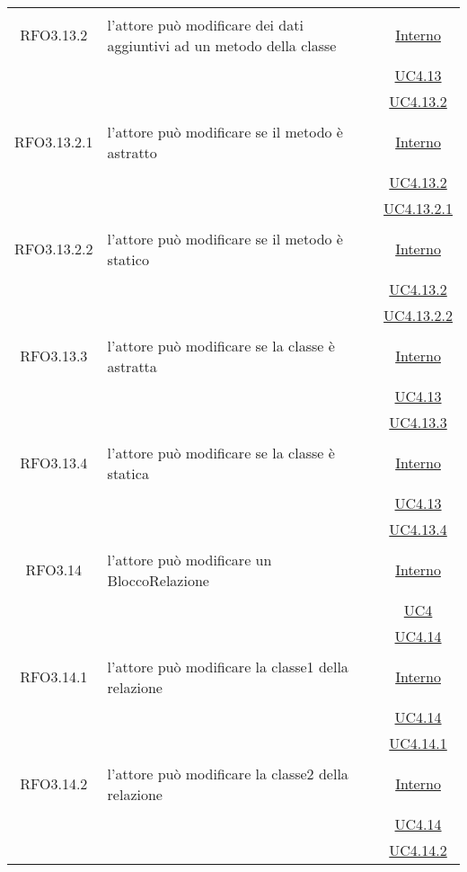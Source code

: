 \begin{longtable}{|c|>{\centering}m{7cm}|c|}
\hypertarget{RFO3.13.2}{RFO3.13.2} & l'attore può modificare dei dati aggiuntivi ad un metodo della classe & \hyperlink{Interno}{Interno}\\
& &\hyperref[UC4.13]{UC4.13}\\
& &\hyperref[UC4.13.2]{UC4.13.2}\\ \hline

\hypertarget{RFO3.13.2.1}{RFO3.13.2.1} & l'attore può modificare se il metodo è astratto & \hyperlink{Interno}{Interno}\\
& &\hyperref[UC4.13.2]{UC4.13.2}\\
& &\hyperref[UC4.13.2.1]{UC4.13.2.1}\\ \hline

\hypertarget{RFO3.13.2.2}{RFO3.13.2.2} & l'attore può modificare se il metodo è statico & \hyperlink{Interno}{Interno}\\
& &\hyperref[UC4.13.2]{UC4.13.2}\\
& &\hyperref[UC4.13.2.2]{UC4.13.2.2}\\ \hline%

\hypertarget{RFO3.13.3}{RFO3.13.3} & l'attore può modificare se la classe è astratta & \hyperlink{Interno}{Interno}\\
& &\hyperref[UC4.13]{UC4.13}\\
& &\hyperref[UC4.13.3]{UC4.13.3}\\ \hline

\hypertarget{RFO3.13.4}{RFO3.13.4} & l'attore può modificare se la classe è statica & \hyperlink{Interno}{Interno}\\
& &\hyperref[UC4.13]{UC4.13}\\
& &\hyperref[UC4.13.4]{UC4.13.4}\\ \hline

\hypertarget{RFO3.14}{RFO3.14} & l'attore può modificare un BloccoRelazione &  \hyperlink{Interno}{Interno}\\
& &\hyperref[UC4]{UC4}\\
& &\hyperref[UC4.14]{UC4.14}\\ \hline

\hypertarget{RFO3.14.1}{RFO3.14.1} & l'attore può modificare la classe1 della relazione &  \hyperlink{Interno}{Interno}\\
& &\hyperref[UC4.14]{UC4.14}\\
& &\hyperref[UC4.14.1]{UC4.14.1}\\ \hline

\hypertarget{RFO3.14.2}{RFO3.14.2} & l'attore può modificare la classe2 della relazione &  \hyperlink{Interno}{Interno}\\
& &\hyperref[UC4.14]{UC4.14}\\
& &\hyperref[UC4.14.2]{UC4.14.2}\\ \hline


\end{longtable}
